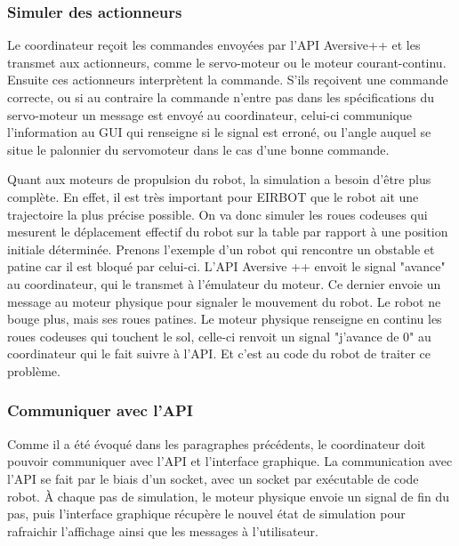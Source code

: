 \subsubsection{Simuler des actionneurs}
Le coordinateur reçoit les commandes envoyées par l'API Aversive++ et les transmet aux actionneurs, comme le servo-moteur ou le moteur courant-continu. Ensuite ces actionneurs interprètent la commande. S'ils reçoivent une commande correcte, ou si au contraire la commande n'entre pas dans les spécifications du servo-moteur un message est envoyé au coordinateur, celui-ci communique l'information au GUI qui renseigne si le signal est erroné, ou l'angle auquel se situe le palonnier du servomoteur dans le cas d'une bonne commande.

Quant aux moteurs de propulsion du robot, la simulation a besoin d'être plus complète. En effet, il est très important pour EIRBOT que le robot ait une trajectoire la plus précise possible.
On va donc simuler les roues codeuses qui mesurent le déplacement effectif du robot sur la table par rapport à une position initiale déterminée.
Prenons l'exemple d'un robot qui rencontre un obstable et patine car il est bloqué par celui-ci. L'API Aversive ++ envoit le signal "avance" au coordinateur, qui le transmet à l'émulateur du moteur. Ce dernier envoie un message au moteur physique pour signaler le mouvement du robot. Le robot ne bouge plus, mais ses roues patines. Le moteur physique renseigne en continu les roues codeuses qui touchent le sol, celle-ci renvoit un signal "j'avance de 0" au coordinateur qui le fait suivre à l'API. Et c'est au code du robot de traiter ce problème.

\subsubsection{Communiquer avec l'API}
Comme il a été évoqué dans les paragraphes précédents, le coordinateur doit pouvoir communiquer avec l'API et l'interface graphique. La communication avec l'API se fait par le biais d'un socket, avec un socket par exécutable de code robot. À chaque pas de simulation, le moteur physique envoie un signal de fin du pas, puis l'interface graphique récupère le nouvel état de simulation pour rafraichir l'affichage ainsi que les messages à l'utilisateur.
   
